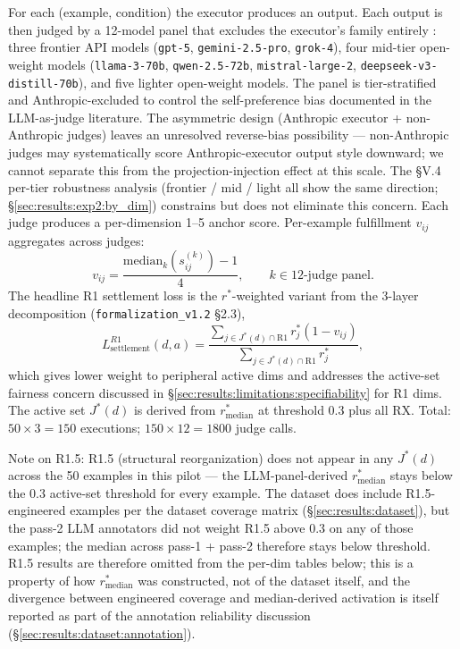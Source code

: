 For each (example, condition) the executor produces an output. Each output is then judged by a 12-model panel that excludes the executor's family entirely : three frontier API models (\texttt{gpt-5}, \texttt{gemini-2.5-pro}, \texttt{grok-4}), four mid-tier open-weight models (\texttt{llama-3-70b}, \texttt{qwen-2.5-72b}, \texttt{mistral-large-2}, \texttt{deepseek-v3-distill-70b}), and five lighter open-weight models. The panel is tier-stratified and Anthropic-excluded to control the self-preference bias documented in the LLM-as-judge literature. The asymmetric design (Anthropic executor + non-Anthropic judges) leaves an unresolved reverse-bias possibility --- non-Anthropic judges may systematically score Anthropic-executor output style downward; we cannot separate this from the projection-injection effect at this scale. The §V.4 per-tier robustness analysis (frontier / mid / light all show the same direction; \S\ref{sec:results:exp2:by_dim}) constrains but does not eliminate this concern. Each judge produces a per-dimension 1--5 anchor score. Per-example fulfillment $v_{ij}$ aggregates across judges:
\begin{equation}
v_{ij} = \frac{\mathrm{median}_k(s_{ij}^{(k)}) - 1}{4}, \qquad k \in \text{12-judge panel}.
\label{eq:v_ij}
\end{equation}
The headline R1 settlement loss is the $r^*$-weighted variant from the 3-layer decomposition (\texttt{formalization\_v1.2} \S2.3),
\begin{equation}
L_{\text{settlement}}^{R1}(d, a) = \frac{\sum_{j \in J^*(d) \cap \text{R1}} r^*_j (1 - v_{ij})}{\sum_{j \in J^*(d) \cap \text{R1}} r^*_j},
\label{eq:L_settle_R1}
\end{equation}
which gives lower weight to peripheral active dims and addresses the active-set fairness concern discussed in \S\ref{sec:results:limitations:specifiability} for R1 dims. The active set $J^*(d)$ is derived from $r^*_{\text{median}}$ at threshold 0.3 plus all RX. Total: $50 \times 3 = 150$ executions; $150 \times 12 = 1800$ judge calls.

Note on R1.5: R1.5 (structural reorganization) does not appear in any $J^*(d)$ across the 50 examples in this pilot --- the LLM-panel-derived $r^*_{\text{median}}$ stays below the 0.3 active-set threshold for every example. The dataset does include R1.5-engineered examples per the dataset coverage matrix (\S\ref{sec:results:dataset}), but the pass-2 LLM annotators did not weight R1.5 above 0.3 on any of those examples; the median across pass-1 + pass-2 therefore stays below threshold. R1.5 results are therefore omitted from the per-dim tables below; this is a property of how $r^*_{\text{median}}$ was constructed, not of the dataset itself, and the divergence between engineered coverage and median-derived activation is itself reported as part of the annotation reliability discussion (\S\ref{sec:results:dataset:annotation}).


